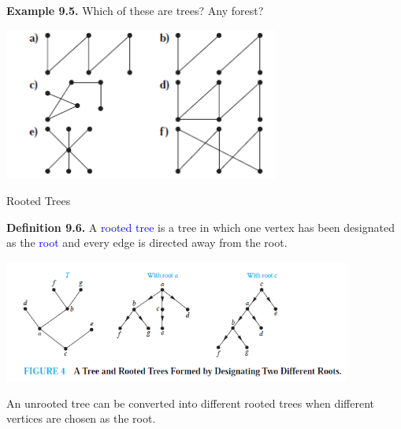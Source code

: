 \documentclass[aspectratio=169]{beamer}
\providecommand{\Blue}[1]{\textcolor{blue}{#1}}
\begin{document}
\begin{frame}[plain]{}

{\bf Example 9.5.} Which of these are trees? Any forest?
 \begin{center}
        \includegraphics[height=5cm]{./img/lecture9-fig8.png}
      \end{center}
      
      
\end{frame}


\begin{frame}[plain]{Rooted Trees}
  
   {\bf Definition 9.6.} A \Blue{rooted tree} is a tree in which one vertex
      has been designated as the \Blue{root} and every edge is
	directed away from the root.
	
     \begin{center}
        \includegraphics[height=4cm]{./img/lecture9-fig3.png}
      \end{center}
 
   An unrooted tree can be converted into different rooted
	trees when different vertices are chosen as the root. 
 
\end{frame}
\end{document}
